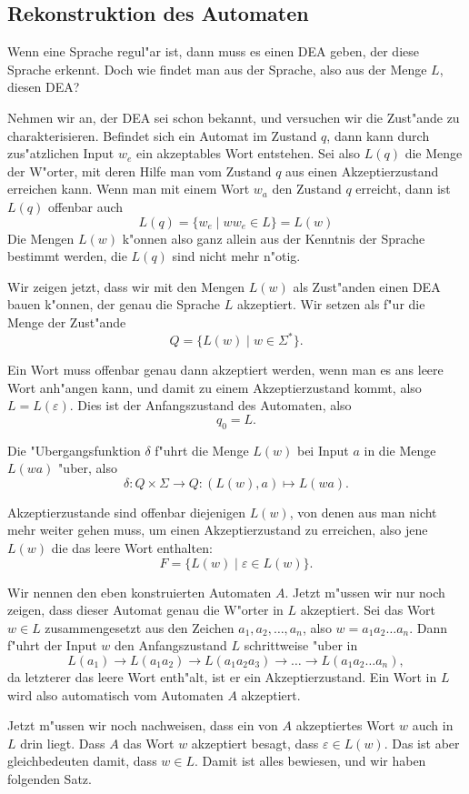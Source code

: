 \subsection{Rekonstruktion des Automaten}
Wenn eine Sprache regul"ar ist, dann muss es einen DEA geben, der
diese Sprache erkennt. Doch wie findet man aus der Sprache, also 
aus der Menge $L$, diesen DEA?

Nehmen wir an, der DEA sei schon bekannt, und versuchen wir
die Zust"ande zu charakterisieren. Befindet sich ein Automat
im Zustand $q$, dann kann durch zus"atzlichen Input $w_e$ ein
akzeptables Wort entstehen. Sei also
$L(q)$ die Menge der W"orter, mit deren Hilfe man vom Zustand $q$
aus einen Akzeptierzustand erreichen kann. Wenn man mit einem Wort
$w_a$ den Zustand $q$ erreicht, dann ist $L(q)$ offenbar auch
\[
L(q)=\{ w_e\;|\; ww_e \in L\}= L(w)
\]
Die Mengen $L(w)$ k"onnen also ganz allein aus der Kenntnis der
Sprache bestimmt werden, die $L(q)$ sind nicht mehr n"otig.

Wir zeigen jetzt, dass wir mit den Mengen $L(w)$ als Zust"anden einen
DEA bauen k"onnen, der genau die Sprache $L$ akzeptiert.
Wir setzen als f"ur die Menge der Zust"ande 
\[
Q=\{L(w)\;|\;w\in\Sigma^*\}.
\]

Ein Wort muss offenbar genau dann akzeptiert werden, wenn
man es ans leere Wort anh"angen kann, und damit zu einem Akzeptierzustand
kommt, also $L=L(\varepsilon)$. Dies ist der Anfangszustand des Automaten,
also
\[
q_0=L.
\]

Die "Ubergangsfunktion $\delta$ f"uhrt die Menge $L(w)$ bei Input
$a$ in die Menge $L(wa)$ "uber, also
\[
\delta \colon Q\times\Sigma\to Q:(L(w),a)\mapsto L(wa).
\]

Akzeptierzustande sind offenbar diejenigen $L(w)$, von denen
aus man nicht mehr weiter gehen muss, um einen Akzeptierzustand
zu erreichen, also jene $L(w)$ die das leere Wort enthalten:
\[
F=\{L(w)\;|\;\varepsilon\in L(w)\}.
\]

Wir nennen den eben konstruierten Automaten $A$.
Jetzt m"ussen wir nur noch zeigen, dass dieser Automat genau die
W"orter in $L$ akzeptiert.
Sei das Wort $w\in L$ zusammengesetzt aus den
Zeichen $a_1,a_2,\dots,a_n$, also $w=a_1a_2\dots a_n$. Dann f"uhrt
der Input $w$ den Anfangszustand $L$ schrittweise "uber in
\[
L(a_1)\to L(a_1a_2)\to L(a_1a_2a_3)\to \dots \to L(a_1a_2\dots a_n),
\]
da letzterer das leere Wort enth"alt, ist er ein Akzeptierzustand.
Ein Wort in $L$ wird also automatisch vom Automaten $A$ akzeptiert.

Jetzt m"ussen wir noch nachweisen, dass ein von $A$ akzeptiertes Wort $w$
auch in $L$ drin liegt. Dass $A$ das
Wort $w$ akzeptiert besagt, dass $\varepsilon \in L(w)$.
Das ist aber gleichbedeuten damit, dass $w\in L$. Damit ist alles
bewiesen, und wir haben folgenden Satz.

